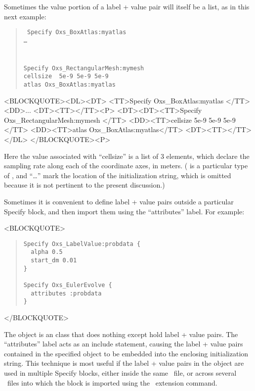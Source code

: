 Sometimes the value portion of a label + value pair will itself be a list,
as in this next example:
\begin{latexonly}
\begin{quote}\tt
Specify Oxs\_BoxAtlas:myatlas \ocb\\
\bi\bi\ldots\\
\ccb\\
\\
Specify Oxs\_RectangularMesh:mymesh \ocb \\
\bi cellsize \ocb\ 5e-9 5e-9 5e-9 \ccb\\
\bi atlas Oxs\_BoxAtlas:myatlas\\
\ccb
\end{quote}
\end{latexonly}
\begin{rawhtml}<BLOCKQUOTE><DL><DT>
<TT>Specify Oxs_BoxAtlas:myatlas {</TT>
<DD>...
<DT><TT>}</TT><P>
<DT><DT><TT>Specify Oxs_RectangularMesh:mymesh {</TT>
<DD><TT>cellsize { 5e-9 5e-9 5e-9 }</TT>
<DD><TT>atlas Oxs_BoxAtlas:myatlas</TT>
<DT><TT>}</TT></DL>
</BLOCKQUOTE><P>
\end{rawhtml}
Here the value associated with ``cellsize'' is a list of 3 elements,
which declare the sampling rate along each of the coordinate axes, in
meters.  ( is a particular type of ,
and ``\ldots'' mark the location of the 
initialization string, which is omitted because it is not pertinent to
the present discussion.)

%
\label{par:specifyAttributes}
Sometimes it is convenient to define label + value pairs outside a
particular Specify block, and then import them using the
``attributes'' label.  For example:
\begin{rawhtml}
<BLOCKQUOTE>
\end{rawhtml}
\begin{quote}
\begin{verbatim}
Specify Oxs_LabelValue:probdata {
  alpha 0.5
  start_dm 0.01
}

Specify Oxs_EulerEvolve {
  attributes :probdata
}
\end{verbatim}
\end{quote}
\begin{rawhtml}
</BLOCKQUOTE>
\end{rawhtml}
The  object is an  class that does
nothing except hold label + value pairs.  The ``attributes'' label acts as an
include statement, causing the label + value pairs contained in the
specified  object to be embedded into the enclosing
 initialization string.  This technique is most useful if the
label + value pairs in the  object are used in
multiple Specify blocks, either inside the same \MIF\ file, or
across several \MIF\ files into which the  block is
imported using the  \MIF\ extension command.

